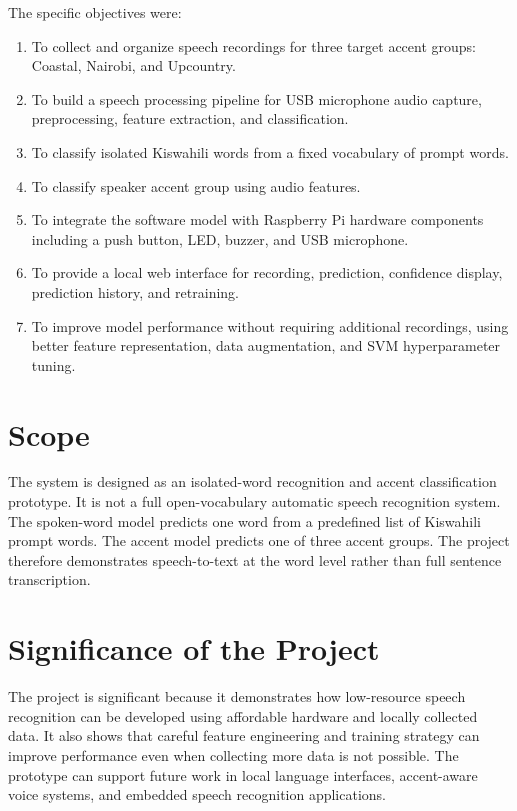 \documentclass[12pt,a4paper]{report}
\begin{document}
The specific objectives were:

\begin{enumerate}
    \item To collect and organize speech recordings for three target accent groups: Coastal, Nairobi, and Upcountry.
    \item To build a speech processing pipeline for USB microphone audio capture, preprocessing, feature extraction, and classification.
    \item To classify isolated Kiswahili words from a fixed vocabulary of prompt words.
    \item To classify speaker accent group using audio features.
    \item To integrate the software model with Raspberry Pi hardware components including a push button, LED, buzzer, and USB microphone.
    \item To provide a local web interface for recording, prediction, confidence display, prediction history, and retraining.
    \item To improve model performance without requiring additional recordings, using better feature representation, data augmentation, and SVM hyperparameter tuning.
\end{enumerate}

\section{Scope}
The system is designed as an isolated-word recognition and accent classification prototype. It is not a full open-vocabulary automatic speech recognition system. The spoken-word model predicts one word from a predefined list of Kiswahili prompt words. The accent model predicts one of three accent groups. The project therefore demonstrates speech-to-text at the word level rather than full sentence transcription.

\section{Significance of the Project}
The project is significant because it demonstrates how low-resource speech recognition can be developed using affordable hardware and locally collected data. It also shows that careful feature engineering and training strategy can improve performance even when collecting more data is not possible. The prototype can support future work in local language interfaces, accent-aware voice systems, and embedded speech recognition applications.
\end{document}

